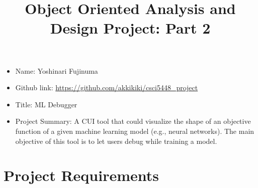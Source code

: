 \documentclass[11pt]{article}
\begin{document}
\vspace{-1cm}
\title{\vspace{-2ex} Object Oriented Analysis and Design Project: Part 2\vspace{-2ex}}
\date{\vspace{-6ex}}
\maketitle


\begin{itemize}[leftmargin=4\parindent,itemsep=-1ex]
 \item Name: Yoshinari Fujinuma
 \item Github link: \url{https://github.com/akkikiki/csci5448_project}
 \item Title: ML Debugger
 \item Project Summary: A CUI tool that could visualize the shape of an objective function of a given machine learning model (e.g., neural networks). The main objective of this tool is to let users debug while training a model. 
\end{itemize}


\section{Project Requirements}
\end{document}
